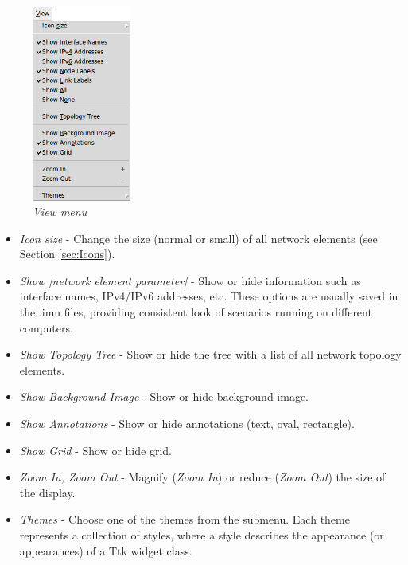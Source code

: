   \begin{figure}[H]
  \centering
  \vspace{10pt}
  \includegraphics[width=0.29\textwidth]{./images/view_menu.png}
  \caption{\emph{View menu}}
  \label{fig:view_menu}
  \end{figure}
  
  \begin{itemize}
  \item \emph{Icon size} - Change the size (normal or small) of all network
elements (see Section \ref{sec:Icons}).  
  \item \emph{Show [network element parameter]} - Show or hide information such
as interface names, IPv4/IPv6 addresses, etc. These options are usually saved
in the .imn files, providing consistent look of scenarios running on different
computers.
  \item \emph{Show Topology Tree} - Show or hide the tree with a list of all
network topology elements.
  \item \emph{Show Background Image} - Show or hide background image.
  \item \emph{Show Annotations} - Show or hide annotations (text, oval,
rectangle).
  \item \emph{Show Grid} - Show or hide grid.
  \item \emph{Zoom In, Zoom Out} - Magnify (\emph{Zoom In}) or reduce
(\emph{Zoom Out}) the size of the display. 
  \item \emph{Themes} - Choose one of the themes from the submenu. Each theme
represents a collection of styles, where a style describes the appearance (or
appearances) of a Ttk widget class.
  \end{itemize}
  
